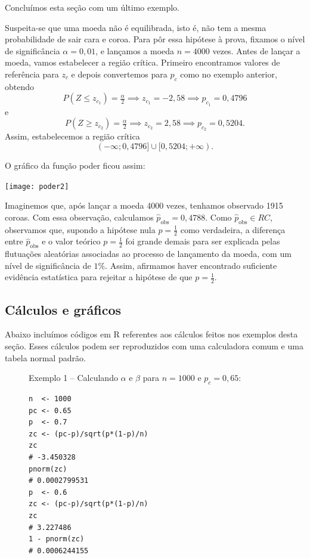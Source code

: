 \documentclass[12pt,a4paper]{article}
\theoremstyle{plain}
\theoremstyle{definition}
\theoremstyle{remark}
\newenvironment{example}{\pushQED{\qed}\renewcommand{\qedsymbol}{\scriptsize$\triangle$}\examplex}{\popQED\endexamplex}
\begin{document}
Concluímos esta seção com um último exemplo.

\begin{example}
Suspeita-se que uma moeda não é equilibrada, isto é, não tem a mesma probabilidade de sair cara e coroa.
Para pôr essa hipótese à prova, fixamos o nível de significância $\alpha=0,01$, e lançamos a moeda $n=4000$ vezes.
Antes de lançar a moeda, vamos estabelecer a região crítica.
Primeiro encontramos valores de referência para $z_c$ e depois convertemos para $p_c$ como no exemplo anterior, obtendo
\[
P(Z \leq z_{c_1})=\tfrac{\alpha}{2}
\implies
z_{c_1} = -2,58
\implies
p_{c_1} = 0,4796
\]
e
\[
P(Z \geq z_{c_2})=\tfrac{\alpha}{2}
\implies
z_{c_2} = 2,58
\implies
p_{c_2} = 0,5204
.
\]
Assim, estabelecemos a região crítica
\[
(-\infty; 0,4796] \cup [0,5204; +\infty)
.
\]

O gráfico da função poder ficou assim:

\hfil \texttt{[image: poder2]}

Imaginemos que, após lançar a moeda 4000 vezes, tenhamos observado 1915 coroas.
Com essa observação, calculamos $\hat{p}_{\mathrm{obs}}=0,4788$.
Como $\hat{p}_{\mathrm{obs}} \in RC$, observamos que, supondo a hipótese nula $p=\frac{1}{2}$ como verdadeira, a diferença entre $\hat{p}_{\mathrm{obs}}$ e o valor teórico $p=\frac{1}{2}$ foi grande demais para ser explicada pelas flutuações aleatórias associadas ao processo de lançamento da moeda, com um nível de significância de $1\%$.
Assim, afirmamos haver encontrado suficiente evidência estatística para rejeitar a hipótese de que $p=\frac{1}{2}$.
\end{example}

\subsection*{Cálculos e gráficos}

Abaixo incluímos códigos em R referentes aos cálculos feitos nos exemplos desta seção.
Esses cálculos podem ser reproduzidos com uma calculadora comum e uma tabela normal padrão.
	
\begin{figure}[H]
Exemplo 1
--
Calculando $\alpha$ e $\beta$ para $n=1000$ e $p_c=0,65$:
\footnotesize
\begin{verbatim}
n  <- 1000
pc <- 0.65
p  <- 0.7
zc <- (pc-p)/sqrt(p*(1-p)/n)
zc
# -3.450328
pnorm(zc)
# 0.0002799531
p  <- 0.6
zc <- (pc-p)/sqrt(p*(1-p)/n)
zc
# 3.227486
1 - pnorm(zc)
# 0.0006244155
\end{verbatim}
\end{figure}
\end{document}
